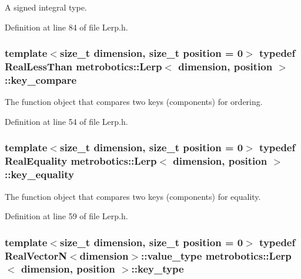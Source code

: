 \-A signed integral type. 



\-Definition at line 84 of file \-Lerp.\-h.

\hypertarget{classmetrobotics_1_1Lerp_af2461f16ba03ed44a4896aba2cea4d29}{
\subsubsection[{key\-\_\-compare}]{\setlength{\rightskip}{0pt plus 5cm}template$<$size\-\_\-t dimension, size\-\_\-t position = 0$>$ typedef {\bf \-Real\-Less\-Than} {\bf metrobotics\-::\-Lerp}$<$ dimension, position $>$\-::{\bf key\-\_\-compare}}}\label{classmetrobotics_1_1Lerp_af2461f16ba03ed44a4896aba2cea4d29}


\-The function object that compares two keys (components) for ordering. 



\-Definition at line 54 of file \-Lerp.\-h.

\hypertarget{classmetrobotics_1_1Lerp_ae164917b993d09546ee1dff125cc7847}{
\subsubsection[{key\-\_\-equality}]{\setlength{\rightskip}{0pt plus 5cm}template$<$size\-\_\-t dimension, size\-\_\-t position = 0$>$ typedef {\bf \-Real\-Equality} {\bf metrobotics\-::\-Lerp}$<$ dimension, position $>$\-::{\bf key\-\_\-equality}}}\label{classmetrobotics_1_1Lerp_ae164917b993d09546ee1dff125cc7847}


\-The function object that compares two keys (components) for equality. 



\-Definition at line 59 of file \-Lerp.\-h.

\hypertarget{classmetrobotics_1_1Lerp_a3cd6f9215623083b5ed90f4c03ac6dc7}{
\subsubsection[{key\-\_\-type}]{\setlength{\rightskip}{0pt plus 5cm}template$<$size\-\_\-t dimension, size\-\_\-t position = 0$>$ typedef {\bf \-Real\-Vector\-N}$<$dimension$>$\-::{\bf value\-\_\-type} {\bf metrobotics\-::\-Lerp}$<$ dimension, position $>$\-::{\bf key\-\_\-type}}}\label{classmetrobotics_1_1Lerp_a3cd6f9215623083b5ed90f4c03ac6dc7}


